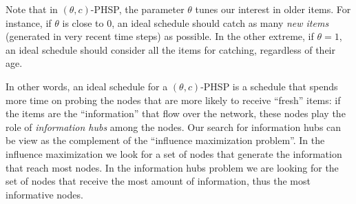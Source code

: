 Note that in $(\theta,c)$-PHSP, the parameter $\theta$ tunes our interest in older items. For instance, if $\theta$ is close to 0, an ideal schedule should catch as many \emph{new items} (generated in very recent time steps) as possible.
 In the other extreme, if $\theta=1$, an ideal schedule should consider all the items for catching, regardless of their age.


In other words, an ideal schedule for a $(\theta, c)$-PHSP is a schedule that spends more time on probing the nodes that are more likely to receive ``fresh'' items: if the items are the ``information'' that flow over the network, these nodes play the role of  \emph{information hubs} among the nodes. Our search for information hubs can be view as the complement of the ``influence maximization problem''\cite{Kempe2003,Kempe2005}. In the influence maximization we look for a set of nodes that generate the information that reach most nodes. In the information hubs problem we are looking for the set of nodes that receive the most amount of information, thus the most informative nodes.


 

